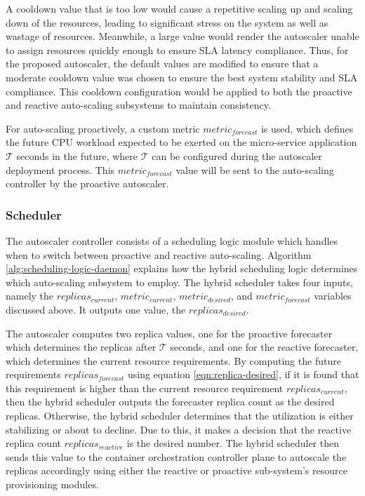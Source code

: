 A cooldown value that is too low would cause a repetitive scaling up and scaling down of the resources, leading to significant stress on the system as well as wastage of resources. Meanwhile, a large value would render the autoscaler unable to assign resources quickly enough to ensure SLA latency compliance. Thus, for the proposed autoscaler, the default values are modified to ensure that a moderate cooldown value was chosen to ensure the best system stability and SLA compliance. This cooldown configuration would be applied to both the proactive and reactive auto-scaling subsystems to maintain consistency.\par

For auto-scaling proactively, a custom metric $metric_{forecast}$ is used, which defines the future CPU workload expected to be exerted on the micro-service application $\mathcal{T}$ seconds in the future, where $\mathcal{T}$ can be configured during the autoscaler deployment process. This $metric_{forecast}$ value will be sent to the auto-scaling controller by the proactive autoscaler.\par

\subsubsection{Scheduler}

The autoscaler controller consists of a scheduling logic module which handles when to switch between proactive and reactive auto-scaling. Algorithm \ref{alg:scheduling-logic-daemon} explains how the hybrid scheduling logic determines which auto-scaling subsystem to employ. The hybrid scheduler takes four inputs, namely the $replicas_{current}$, $metric_{current}$, $metric_{desired}$, and $metric_{forecast}$ variables discussed above. It outputs one value, the $replicas_{desired}$.\par

The autoscaler computes two replica values, one for the proactive forecaster which determines the replicas after $\mathcal{T}$ seconds, and one for the reactive forecaster, which determines the current resource requirements. By computing the future requirements $replicas_{forecast}$ using equation \ref{eqn:replica-desired}, if it is found that this requirement is higher than the current resource requirement $replicas_{current}$, then the hybrid scheduler outputs the forecaster replica count as the desired replicas. Otherwise, the hybrid scheduler determines that the utilization is either stabilizing or about to decline. Due to this, it makes a decision that the reactive replica count $replicas_{reactive}$ is the desired number. The hybrid scheduler then sends this value to the container orchestration controller plane to autoscale the replicas accordingly using either the reactive or proactive sub-system's resource provisioning modules.\par

